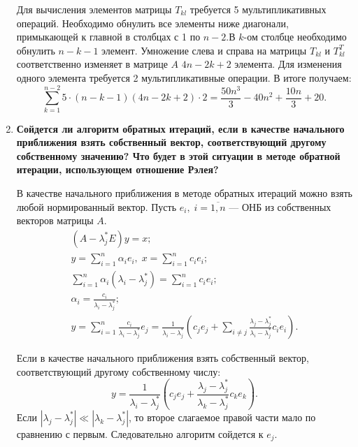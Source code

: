 \documentclass[12pt, a4paper]{article}
\begin{document}
\begin{enumerate}
    Для вычисления элементов матрицы $ T_{kl} $ требуется 5 мультипликативных операций. Необходимо обнулить все элементы ниже диагонали, примыкающей к главной в столбцах с 1 по $ n - 2 $.В $k$-ом столбце необходимо обнулить $ n - k - 1 $ элемент. Умножение слева и справа на матрицы $ T_{kl} $ и $ T_{kl}^{T} $ соответственно изменяет в матрице $ A $ $4n - 2k + 2 $ элемента. Для изменения одного элемента требуется 2 мультипликативные операции. В итоге получаем:
	\[ \sum \limits_{k = 1}^{n - 2} 5 \cdot (n - k - 1) (4 n - 2k + 2) \cdot 2 = \frac{50 n^3}{3} - 40 n^2 + \frac{10 n}{3} + 20. \]


    \item {\bf Сойдется ли алгоритм обратных итераций, если в качестве начального приближения взять собственный вектор, соответствующий другому собственному значению? Что будет в этой ситуации в методе обратной итерации, использующем отношение Рэлея? }
    
    В качестве начального приближения в методе обратных итераций можно взять любой нормированный вектор. Пусть $e_{i}, \; i = \overline{1,n}$ --- ОНБ из собственных векторов матрицы $A$.
	\begin{gather*}
		(A - {\lambda}_{j}^{\ast} E) y = x; \\
		y = \sum \limits_{i = 1}^{n} \alpha_{i} e_{i}, \; x = \sum \limits_{i = 1}^{n} c_{i} e_{i}; \\
		\sum \limits_{i = 1}^{n} \alpha_{i} (\lambda_{i} - {\lambda}_{j}^{\ast}) = \sum \limits_{i = 1}^{n} c_{i} e_{i}; \\	
		\alpha_{i} = \frac{c_{i}}{\lambda_{i} - {\lambda}_{j}^{\ast}}; \\
		y = \sum \limits_{i = 1}^{n} \frac{c_{i}}{\lambda_{i} - {\lambda}_{j}^{\ast}} e_{j} = \frac{1}{\lambda_{i} - {\lambda}_{j}^{\ast}} \left( c_{j} e_{j} + \sum \limits_{i \ne j} \frac{\lambda_{j} - {\lambda}_{j}^{\ast}}{\lambda_{i} - {\lambda}_{j}^{\ast}} c_{i} e_{i} \right).
	\end{gather*}
	
	Если в качестве начального приближения взять собственный вектор, соответствующий другому собственному числу:
	\[ y = \frac{1}{\lambda_{i} - {\lambda}_{j}^{\ast}} \left( c_{j} e_{j} + \frac{\lambda_{j} - {\lambda}_{j}^{\ast}}{\lambda_{k} - {\lambda}_{j}^{\ast}} c_{k} e_{k} \right). \]
	Если $ | \lambda_{j} - {\lambda}_{j}^{\ast} | \ll | \lambda_{k} - {\lambda}_{j}^{\ast} | $, то второе слагаемое правой части мало по сравнению с первым. Следовательно  алгоритм сойдется к $e_{j}$.
	

\end{enumerate}
\end{document}
